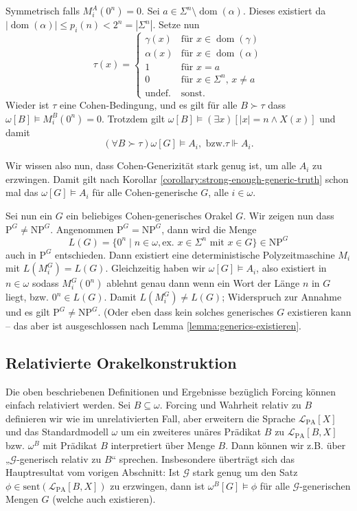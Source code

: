 \documentclass[nofonts]{uebung}
\theoremstyle{definition}
\def\P{\ensuremath{\mathrm{P}}}
\def\NP{\ensuremath{\mathrm{NP}}}
\DeclareMathOperator{\dom}{dom}
\begin{document}
Symmetrisch falls $M_i^A(0^n)=0$. Sei $a\in \Sigma^n\setminus\dom(\alpha)$. Dieses existiert da $|\dom(\alpha)|\leq p_i(n)<2^n=|\Sigma^n|$. Setze nun
\[ \tau(x) =\begin{cases} \gamma(x) & \text{für $x\in\dom(\gamma)$}\\\alpha(x) & \text{für $x\in\dom(\alpha)$}\\1&\text{für $x=a$}\\0&\text{für $x\in\Sigma^n$, $x\neq a$}\\\text{undef.} & \text{sonst}.\end{cases} \]
Wieder ist $\tau$ eine Cohen-Bedingung, und es gilt für alle $B\succ \tau$ dass $\omega[B] \vDash M_i^B(0^n)=0$.
Trotzdem gilt $\omega[B] \vDash (\exists x)[|x|=n\land X(x)]$ und damit
\[ (\forall B\succ \tau) \omega[G] \vDash A_i, \text{ bzw.} \tau\Vdash A_i. \]

Wir wissen also nun, dass Cohen-Generizität stark genug ist, um alle $A_i$ zu erzwingen. Damit gilt nach Korollar \ref{corollary:strong-enough-generic-truth} schon mal das $\omega[G]\vDash A_i$ für alle Cohen-generische $G$, alle $i\in\omega$.

Sei nun ein $G$ ein beliebiges Cohen-generisches Orakel $G$. Wir zeigen nun dass $\P^G\neq\NP^G$. Angenommen $\P^G=\NP^G$, dann wird die Menge
\[ L(G) = \{ 0^n \mid n\in\omega, \text{ex. $x\in\Sigma^n$ mit $x\in G$} \} \in\NP^G \]
auch in $\P^G$ entschieden.
Dann existiert eine deterministische Polyzeitmaschine $M_i$ mit $L(M_i^G)=L(G)$.
Gleichzeitig haben wir $\omega[G]\vDash A_i$, also existiert in $n\in\omega$ sodass $M_i^G(0^n)$ ablehnt genau dann wenn ein Wort der Länge $n$ in $G$ liegt, bzw. $0^n\in L(G)$. 
Damit $L(M_i^G)\neq L(G)$; Widerspruch zur Annahme und es gilt $\P^G\neq\NP^G$. (Oder eben dass kein solches generisches $G$ existieren kann -- das aber ist ausgeschlossen nach Lemma \ref{lemma:generics-existieren}.

\subsection*{Relativierte Orakelkonstruktion}

Die oben beschriebenen Definitionen und Ergebnisse bezüglich Forcing können einfach relativiert werden. Sei $B\subseteq \omega$. Forcing und Wahrheit relativ zu $B$ definieren wir wie im unrelativierten Fall, aber erweitern die Sprache $\mathcal L_{\mathrm{PA}}[X]$ und das Standardmodell $\omega$ um ein zweiteres unäres Prädikat $B$ zu $\mathcal L_{\mathrm{PA}}[B,X]$ bzw. $\omega^B$ mit Prädikat $B$ interpretiert über Menge $B$. Dann können wir z.B. über „$\mathcal G$-generisch relativ zu $B$“ sprechen.
Insbesondere überträgt sich das Hauptresultat vom vorigen Abschnitt: Ist $\mathcal G$ stark genug um den Satz $\phi\in \mathrm{sent}(\mathcal L_{\mathrm{PA}}[B,X])$ zu erzwingen, dann ist $\omega^B[G]\vDash \phi$ für alle $\mathcal G$-generischen Mengen $G$ (welche auch existieren).
\end{document}
